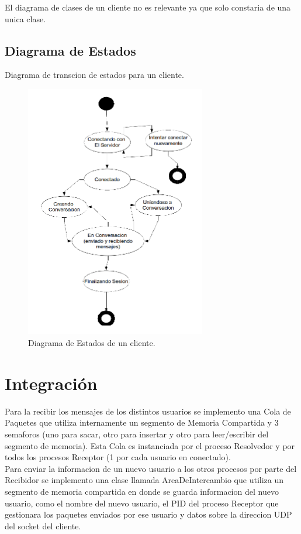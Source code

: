 \documentclass[a4paper,12pt,titlepage]{article}
\begin{document}
El diagrama de clases de un cliente no es relevante ya que solo constaria de una unica clase.

\subsection{Diagrama de Estados}
Diagrama de transcion de estados para un cliente.
\begin{figure}[h!]
\centering
\includegraphics[width=0.7\textwidth]{dia_estados_cliente.png}
\caption{Diagrama de Estados de un cliente.}
\label{fig:estados}
\end{figure}

\newpage
\section{Integración}

Para la recibir los mensajes de los distintos usuarios se implemento una Cola de Paquetes que utiliza internamente un segmento de 
Memoria Compartida y 3 semaforos (uno para sacar, otro para insertar y otro para leer/escribir del segmento de memoria). Esta Cola es 
instanciada por el proceso Resolvedor y por todos los procesos Receptor (1 por cada usuario en conectado).\\

Para enviar la informacion de un nuevo usuario a los otros procesos por parte del Recibidor se implemento una clase llamada AreaDeIntercambio 
que utiliza un segmento de memoria compartida en donde se guarda informacion del nuevo usuario, como el nombre del nuevo usuario, el PID del 
proceso Receptor que gestionara los paquetes enviados por ese usuario y datos sobre la direccion UDP del socket del cliente.\\
\end{document}
